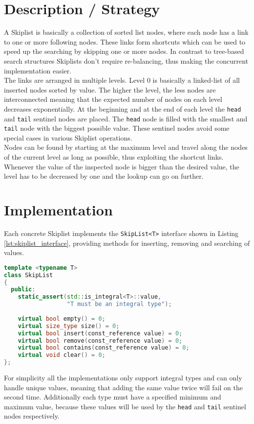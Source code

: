 
\section{Description / Strategy}

A Skiplist is basically a collection of sorted list nodes, where each node has a link to one or more following nodes. These links form shortcuts which can be used to speed up the searching by skipping one or more nodes. In contrast to tree-based search structures Skiplists don't require re-balancing, thus making the concurrent implementation easier.\\

\noindent The links are arranged in multiple levels. Level $0$ is basically a linked-list of all inserted nodes sorted by value. The higher the level, the less nodes are interconnected meaning that the expected number of nodes on each level decreases exponentially. At the beginning and at the end of each level the \texttt{head} and \texttt{tail} sentinel nodes are placed. The \texttt{head} node is filled with the smallest and \texttt{tail} node with the biggest possible value. These sentinel nodes avoid some special cases in various Skiplist operations.\\

\noindent Nodes can be found by starting at the maximum level and travel along the nodes of the current level as long as possible, thus exploiting the shortcut links. Whenever the value of the inspected node is bigger than the desired value, the level has to be decreased by one and the lookup can go on further.

\section{Implementation}

Each concrete Skiplist implements the \texttt{SkipList<T>} interface shown in Listing \ref{lst:skiplist_interface}, providing methods for inserting, removing and searching of values.

\begin{lstlisting}[language=C++, caption={Skiplist Interface}, label=lst:skiplist_interface]
template <typename T>
class SkipList
{
  public:
    static_assert(std::is_integral<T>::value, 
                  "T must be an integral type");
    
    virtual bool empty() = 0;
    virtual size_type size() = 0;
    virtual bool insert(const_reference value) = 0;
    virtual bool remove(const_reference value) = 0;
    virtual bool contains(const_reference value) = 0;
    virtual void clear() = 0;
};
\end{lstlisting}
\noindent For simplicity all the implementations only support integral types and can only handle unique values, meaning that adding the same value twice will fail on the second time. Additionally each type must have a specified minimum and maximum value, because these values will be used by the \texttt{head} and \texttt{tail} sentinel nodes respectively.


